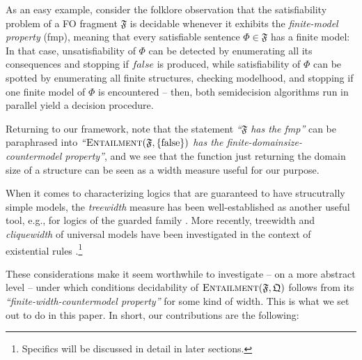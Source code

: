 \begin{example} As an easy example, consider the folklore observation that the satisfiability problem of a FO fragment $\mathfrak{F}$ is decidable whenever it exhibits the \emph{finite-model property} (fmp), meaning that every satisfiable sentence $\Phi \in \mathfrak{F}$ has a finite model: In that case, unsatisfiability of $\Phi$ can be detected by enumerating all its consequences and stopping if $\mathit{false}$ is produced, while satisfiability of $\Phi$ can be spotted by enumerating all finite structures, checking modelhood, and stopping if one finite model of $\Phi$ is encountered -- then, both semidecision algorithms run in parallel yield a decision procedure.

Returning to our framework, note that the statement \textsl{``$\mathfrak{F}$ has the fmp''} can be paraphrased into \textsl{``$\textsc{Entailment}(\mathfrak{F},\{\mathrm{false}\})$ has the finite-domainsize-countermodel property''}, and we see that the function just returning the domain size of a structure can be seen as a width measure useful for our purpose. 
\end{example}

When it comes to characterizing logics that are guaranteed to have strucutrally simple models, the \emph{treewidth} measure \cite{ROBERTSON198449} has been well-established as another useful tool, e.g., for logics of the guarded family \cite{AndrekaNB98,Gradel99}. More recently, treewidth and \emph{cliquewidth} of universal models have been investigated in the context of existential rules \cite{BagLecMugSal11,CaliGK13,ICDT2023}.\footnote{Specifics will be discussed in detail in later sections.}  

\medskip

These considerations make it seem worthwhile to investigate -- on a more abstract level -- under which conditions decidability of $\textsc{Entailment}(\mathfrak{F},\mathfrak{Q})$ follows from its \textsl{``finite-width-countermodel property''} for some kind of width. This is what we set out to do in this paper. In short, our contributions are the following:

